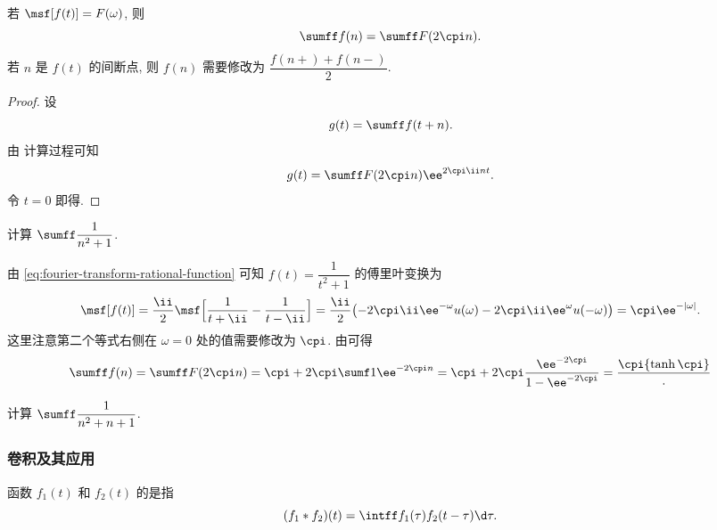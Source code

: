 \begin{theorem}[泊松求和公式]\label{thm:poisson-summation-formula}
  若 $\msf[f(t)]=F(\omega)$, 则
  \[
    \sumff f(n)=\sumff F(2\cpi n).
  \]
  若 $n$ 是 $f(t)$ 的间断点, 则 $f(n)$ 需要修改为 $\dfrac{f(n+)+f(n-)}2$.
\end{theorem}

\begin{proof}
  设
  \[
    g(t)=\sumff f(t+n).
  \]
  由 计算过程可知
  \[
    g(t)=\sumff F(2\cpi n)\ee^{2\cpi \ii  n t}.
  \]
  令 $t=0$ 即得.
\end{proof}

\begin{example}
  计算 $\sumff \dfrac1{n^2+1}$.
\end{example}

\begin{solution}
  由 \ref{eq:fourier-transform-rational-function} 可知 $f(t)=\dfrac1{t^2+1}$ 的傅里叶变换为
  \begin{align*}
    \msf[f(t)]
    =\frac\ii2\msf\Bigl[\frac1{t+\ii}-\frac1{t-\ii}\Bigr]
    =\frac\ii2\bigl(-2\cpi\ii \ee^{-\omega} u(\omega)-2\cpi\ii \ee^{\omega} u(-\omega)\bigr)
    =\cpi \ee^{-|\omega|}.
  \end{align*}
  这里注意第二个等式右侧在 $\omega=0$ 处的值需要修改为 $\cpi$.
  由\thmFPoi 可得
  \[
     \sumff f(n)
    =\sumff F(2\cpi n)
    =\cpi+2\cpi\sumf1 \ee^{-2\cpi n}
    =\cpi+2\cpi\frac{\ee^{-2\cpi}}{1-\ee^{-2\cpi}}
    =\frac\cpi{\tanh\cpi}.
  \]
\end{solution}

\begin{exercise}
  计算 $\sumff \dfrac1{n^2+n+1}$.
\end{exercise}



\subsubsection{卷积及其应用}

\begin{definition}
  函数 $f_1(t)$ 和 $f_2(t)$ 的是指
  \[
    (f_1\ast f_2)(t)=\intff f_1(\tau)f_2(t-\tau)\d \tau.
  \]
\end{definition}

